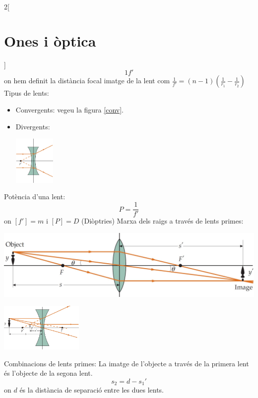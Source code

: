 \documentclass[../../../main.tex]{subfiles}
\begin{document}
\begin{multicols}{2}[\section{Ones i òptica}]
$${1}{f'}$$ {\footnotesize on hem definit la distància focal imatge de la lent com $\frac{
1}{f'}=(n-1)\left(\frac{1}{r_1}-\frac{1}{r_2}\right)$}\newline
Tipus de lents:
\begin{itemize}
    \item Convergents: {\footnotesize vegeu la figura \ref{conv}.}
    \item Divergents:\newline
    \begin{minipage}{\linewidth}
    \centering
    \includegraphics[width=2cm]{Physics/1st/Waves_and_optics/Images/div.jpg} 
\end{minipage}
\end{itemize}
Potència d'una lent: $$P=\frac{1}{f'}$$ {\footnotesize on $[f']=m$ i $[P]=D$ (Diòptries)}\newline
Marxa dels raigs a través de lents primes:
\begin{minipage}{\linewidth}
    \centering
    \includegraphics[width=\linewidth]{Physics/1st/Waves_and_optics/Images/raiglen.jpg} 
\end{minipage}
\begin{minipage}{\linewidth}
    \centering
    \includegraphics[width=4cm]{Physics/1st/Waves_and_optics/Images/raiglen2.jpg} 
\end{minipage}
Combinacions de lents primes: La imatge de l'objecte a través de la primera lent és l'objecte de la segona lent. $$s_2=d-s_1'$$ {\footnotesize on $d$ és la distància de separació entre les dues lents.}

\end{multicols}
\end{document}
